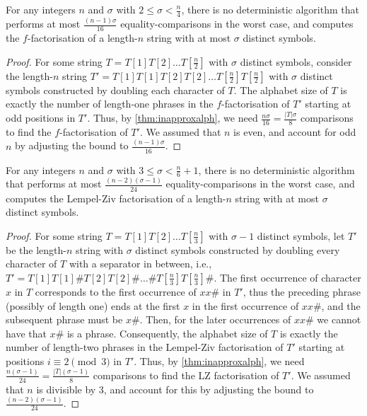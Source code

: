 \begin{corollary}
\label{cor:f-facto}
For any integers $n$ and $\sigma$ with $2 \leq \sigma < \frac{n}4$, there is no deterministic algorithm that performs at most %
$\frac{(n - 1)\sigma}{16}$ %
equality-comparisons in the worst case, and computes the $f$-factorisation of a length-$n$ string with at most $\sigma$ distinct symbols.
\end{corollary}
\begin{proof}
For some string $T = T[1]T[2]\dots T[\frac n 2]$ with $\sigma$ distinct symbols, consider the length-$n$ string $T'=T[1] T[1] T[2] T[2] \dots T[\frac n 2] T[\frac n 2]$ with $\sigma$ distinct symbols constructed by doubling each character of $T$. The alphabet size of $T$ is exactly the number of length-one phrases in the $f$-factorisation of $T'$ starting at odd positions in $T'$. Thus, by \cref{thm:inapproxalph}, we need $\frac{n \sigma}{16} = \frac{|T|\sigma}{8}$ comparisons to find the $f$-factorisation of $T'$. 
We assumed that $n$ is even, and account for odd $n$ by adjusting the bound to $\frac{(n - 1) \sigma}{16}%
$.
\end{proof}

\begin{corollary}
\label{cor:LZ}
For any integers $n$ and $\sigma$ with $3 \leq \sigma < \frac{n}6 + 1$, there is no deterministic algorithm that performs at most %
$\frac{(n - 2)(\sigma-1)}{24}$ %
equality-comparisons in the worst case, and computes the Lempel-Ziv factorisation of a length-$n$ string with at most $\sigma$ distinct symbols.
\end{corollary}
\begin{proof}
For some string $T = T[1]T[2]\dots T[\frac n 3]$ with $\sigma - 1$ distinct symbols, let $T'$ be the length-$n$ string with $\sigma$ distinct symbols constructed by doubling every character of $T$ with a separator in between, i.e., $T'=T[1]T[1] \# T[2]T[2] \# \dots \# T[\frac n 3]T[\frac n 3]\#$. The first occurrence of character $x$ in $T$ corresponds to the first occurrence of $xx\#$ in $T'$, thus the preceding phrase (possibly of length one) ends at the
first $x$ in the first occurrence of $xx\#$, and the subsequent phrase must be $x\#$. Then, for the later occurrences of $xx\#$ we cannot have that $x\#$ is a phrase.
Consequently, the alphabet size of $T$ is exactly the number of length-two phrases in the Lempel-Ziv factorisation of $T'$ starting at positions $i \equiv 2 \pmod 3$ in $T'$.
Thus, by \cref{thm:inapproxalph}, we need $\frac{n(\sigma - 1)}{24} = \frac{|T|(\sigma-1)}{8}$ comparisons to find the LZ factorisation of $T'$.
We assumed that $n$ is divisible by 3, and account for this by adjusting the bound to $\frac{(n - 2) (\sigma - 1)}{24}%
$.
\end{proof}
